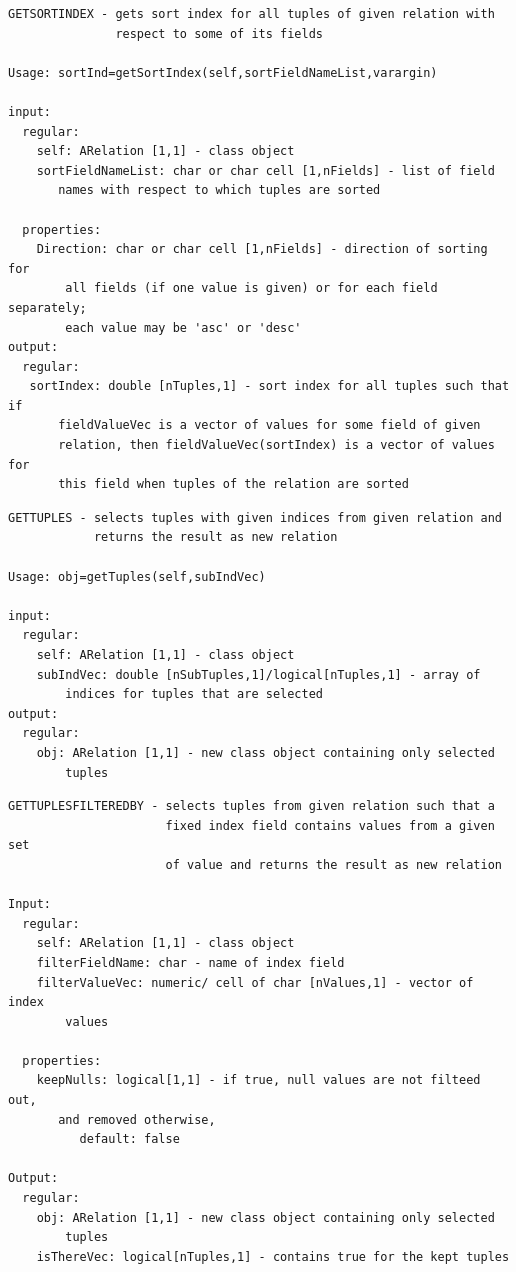 \documentclass[letterpaper,10pt,english]{sphinxmanual}
\begin{document}
\begin{Verbatim}[commandchars=\\\{\}]
GETSORTINDEX - gets sort index for all tuples of given relation with
               respect to some of its fields

Usage: sortInd=getSortIndex(self,sortFieldNameList,varargin)

input:
  regular:
    self: ARelation [1,1] - class object
    sortFieldNameList: char or char cell [1,nFields] - list of field
       names with respect to which tuples are sorted

  properties:
    Direction: char or char cell [1,nFields] - direction of sorting for
        all fields (if one value is given) or for each field separately;
        each value may be 'asc' or 'desc'
output:
  regular:
   sortIndex: double [nTuples,1] - sort index for all tuples such that if
       fieldValueVec is a vector of values for some field of given
       relation, then fieldValueVec(sortIndex) is a vector of values for
       this field when tuples of the relation are sorted
\end{Verbatim}

\begin{Verbatim}[commandchars=\\\{\}]
GETTUPLES - selects tuples with given indices from given relation and
            returns the result as new relation

Usage: obj=getTuples(self,subIndVec)

input:
  regular:
    self: ARelation [1,1] - class object
    subIndVec: double [nSubTuples,1]/logical[nTuples,1] - array of
        indices for tuples that are selected
output:
  regular:
    obj: ARelation [1,1] - new class object containing only selected
        tuples
\end{Verbatim}

\begin{Verbatim}[commandchars=\\\{\}]
GETTUPLESFILTEREDBY - selects tuples from given relation such that a
                      fixed index field contains values from a given set
                      of value and returns the result as new relation

Input:
  regular:
    self: ARelation [1,1] - class object
    filterFieldName: char - name of index field
    filterValueVec: numeric/ cell of char [nValues,1] - vector of index
        values

  properties:
    keepNulls: logical[1,1] - if true, null values are not filteed out,
       and removed otherwise,
          default: false

Output:
  regular:
    obj: ARelation [1,1] - new class object containing only selected
        tuples
    isThereVec: logical[nTuples,1] - contains true for the kept tuples
\end{Verbatim}
\end{document}

